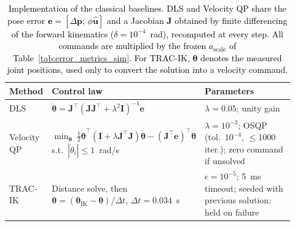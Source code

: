 \documentclass[preprint,12pt]{elsarticle}
\begin{document}
\begin{table}[!htbp]
\centering
\caption{\textcolor{black}{Implementation of the classical baselines. DLS and Velocity QP share the pose error $\mathbf{e}=[\Delta\mathbf{p};\,\phi\hat{\mathbf{u}}]$ and a Jacobian $\mathbf{J}$ obtained by finite differencing of the forward kinematics ($\delta=10^{-4}$~rad), recomputed at every step. All commands are multiplied by the frozen $a_\text{scale}$ of Table~\ref{tab:error_metrics_sim}. For TRAC-IK, $\boldsymbol{\theta}$ denotes the measured joint positions, used only to convert the solution into a velocity command.}}
\label{tab:baselines}
\footnotesize
\renewcommand{\arraystretch}{1.0}
\color{black}
\begin{tabular}{@{}>{\raggedright\arraybackslash}p{0.14\linewidth}>{\raggedright\arraybackslash}p{0.46\linewidth}>{\raggedright\arraybackslash}p{0.32\linewidth}@{}}
\toprule
\textbf{Method} & \textbf{Control law} & \textbf{Parameters} \\
\midrule
DLS &
$\dot{\boldsymbol{\theta}}=\mathbf{J}^{\top}(\mathbf{J}\mathbf{J}^{\top}+\lambda^{2}\mathbf{I})^{-1}\mathbf{e}$ &
$\lambda=0.05$; unity gain \\
Velocity QP &
$\min_{\dot{\boldsymbol{\theta}}}\ \tfrac{1}{2}\dot{\boldsymbol{\theta}}^{\top}(\mathbf{I}+\lambda\mathbf{J}^{\top}\mathbf{J})\dot{\boldsymbol{\theta}}-(\mathbf{J}^{\top}\mathbf{e})^{\top}\dot{\boldsymbol{\theta}}$ \newline
s.t.\ $|\dot{\theta}_i|\le 1$~rad/s &
$\lambda=10^{-3}$; OSQP (tol.\ $10^{-4}$, $\le$1000 iter.); zero command if unsolved \\
TRAC-IK &
Distance solve, then $\dot{\boldsymbol{\theta}}=(\boldsymbol{\theta}_\text{IK}-\boldsymbol{\theta})/\Delta t$, $\Delta t=0.034$~s &
$\epsilon=10^{-5}$; 5~ms timeout; seeded with previous solution; held on failure \\
\bottomrule
\end{tabular}
\end{table}
\end{document}
